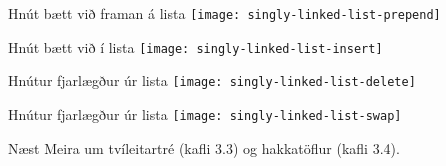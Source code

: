 \documentclass{beamer}
\begin{document}
\begin{frame}[fragile]{Hnút bætt við framan á lista}
	\texttt{[image: singly-linked-list-prepend]}
\end{frame}

\begin{frame}[fragile]{Hnút bætt við í lista}
	\texttt{[image: singly-linked-list-insert]}
\end{frame}

\begin{frame}[fragile]{Hnútur fjarlægður úr lista}
	\texttt{[image: singly-linked-list-delete]}
\end{frame}

\begin{frame}[fragile]{Hnútur fjarlægður úr lista}
	\texttt{[image: singly-linked-list-swap]}
\end{frame}

\begin{frame}{Næst}
	Meira um tvíleitartré (kafli 3.3) og hakkatöflur (kafli 3.4).
\end{frame}
\end{document}
